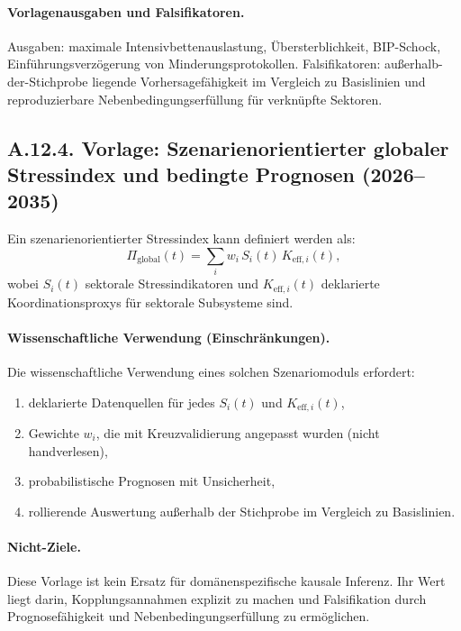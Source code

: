 \documentclass[13pt,a4paper]{article}
\begin{document}
	\paragraph{Vorlagenausgaben und Falsifikatoren.}
	Ausgaben: maximale Intensivbettenauslastung, Übersterblichkeit, BIP-Schock, Einführungsverzögerung von Minderungsprotokollen.
	Falsifikatoren: außerhalb-der-Stichprobe liegende Vorhersagefähigkeit im Vergleich zu Basislinien und reproduzierbare Nebenbedingungserfüllung für verknüpfte Sektoren.
	
	\subsection*{A.12.4. Vorlage: Szenarienorientierter globaler Stressindex und bedingte Prognosen (2026--2035)}
	
	Ein szenarienorientierter Stressindex kann definiert werden als:
	$$ \Pi_{\mathrm{global}}(t) = \sum_i w_i\,S_i(t)\,K_{\mathrm{eff},i}(t), $$
	wobei $S_i(t)$ sektorale Stressindikatoren und $K_{\mathrm{eff},i}(t)$ deklarierte Koordinationsproxys für sektorale Subsysteme sind.
	
	\paragraph{Wissenschaftliche Verwendung (Einschränkungen).}
	Die wissenschaftliche Verwendung eines solchen Szenariomoduls erfordert:
	\begin{enumerate}[leftmargin=*]
		\item deklarierte Datenquellen für jedes $S_i(t)$ und $K_{\mathrm{eff},i}(t)$,
		\item Gewichte $w_i$, die mit Kreuzvalidierung angepasst wurden (nicht handverlesen),
		\item probabilistische Prognosen mit Unsicherheit,
		\item rollierende Auswertung außerhalb der Stichprobe im Vergleich zu Basislinien.
	\end{enumerate}
	
	\paragraph{Nicht-Ziele.}
	Diese Vorlage ist kein Ersatz für domänenspezifische kausale Inferenz. Ihr Wert liegt darin, Kopplungsannahmen explizit zu machen und Falsifikation durch Prognosefähigkeit und Nebenbedingungserfüllung zu ermöglichen.
	
\end{document}
